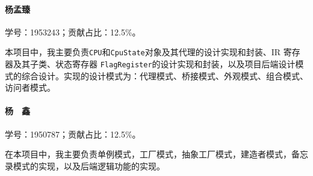 \paragraph*{杨孟臻} 学号：1953243；贡献占比：12.5\%。

本项目中，我主要负责\lstinline{CPU}和\lstinline{CpuState}对象及其代理的设计实现和封装、IR 寄存器及其子类、状态寄存器 \lstinline{FlagRegister}的设计实现和封装，以及项目后端设计模式的综合设计。实现的设计模式为：代理模式、桥接模式、外观模式、组合模式、访问者模式。

\paragraph*{杨　鑫} 学号：1950787；贡献占比：12.5\%。

在本项目中，我主要负责单例模式，工厂模式，抽象工厂模式，建造者模式，备忘录模式的实现，以及后端逻辑功能的实现。


